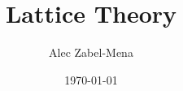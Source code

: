 \documentclass[12pt, twoside]{book}
\title{Lattice Theory}
\author{Alec Zabel-Mena}
\date{\today}
\begin{document}
\maketitle
\tableofcontents
\newpage



\nocite{*}



\end{document}
